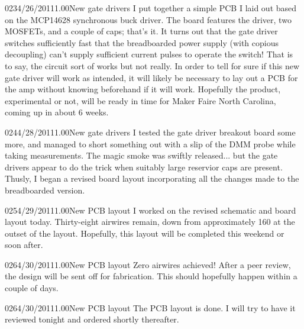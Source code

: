 \documentclass[12pt,letterpaper,onecolumn]{article}
\begin{document}
\begin{nbentry}{023}{4/26/2011}{1.00}{New gate drivers}
I put together a simple PCB I laid out based on the MCP14628 synchronous buck driver.  The board features the driver, two MOSFETs, and a couple of caps; that's it.  It turns out that the gate driver switches sufficiently fast that the breadboarded power supply (with copious decoupling) can't supply sufficient current pulses to operate the switch!  That is to say, the circuit sort of works but not really.  In order to tell for sure if this new gate driver will work as intended, it will likely be necessary to lay out a PCB for the amp without knowing beforehand if it will work.  Hopefully the product, experimental or not, will be ready in time for Maker Faire North Carolina, coming up in about 6 weeks.
\end{nbentry}

\begin{nbentry}{024}{4/28/2011}{1.00}{New gate drivers}
I tested the gate driver breakout board some more, and managed to short something out with a slip of the DMM probe while taking measurements.  The magic smoke was swiftly released... but the gate drivers appear to do the trick when suitably large reservior caps are present.  Thusly, I began a revised board layout incorporating all the changes made to the breadboarded version.
\end{nbentry}

\begin{nbentry}{025}{4/29/2011}{1.00}{New PCB layout}
I worked on the revised schematic and board layout today.  Thirty-eight airwires remain, down from approximately 160 at the outset of the layout.  Hopefully, this layout will be completed this weekend or soon after.
\end{nbentry}

\begin{nbentry}{026}{4/30/2011}{1.00}{New PCB layout}
Zero airwires achieved!  After a peer review, the design will be sent off for fabrication.  This should hopefully happen within a couple of days.
\end{nbentry}

\begin{nbentry}{026}{4/30/2011}{1.00}{New PCB layout}
The PCB layout is done.  I will try to have it reviewed tonight and ordered shortly thereafter.
\end{nbentry}
\end{document}
